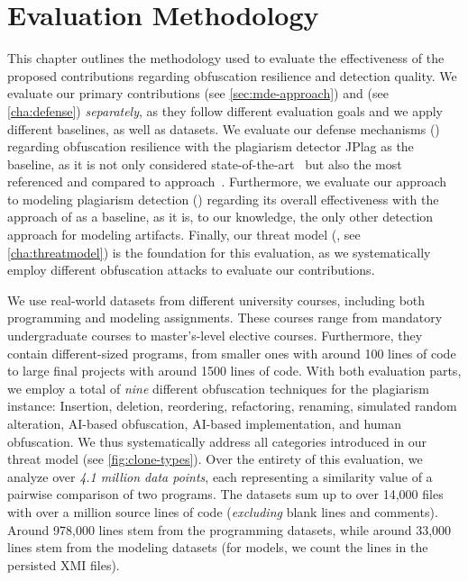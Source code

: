 \chapter{Evaluation Methodology}\label{cha:methodology}
This chapter outlines the methodology used to evaluate the effectiveness of the proposed contributions regarding obfuscation resilience and detection quality.
We evaluate our primary contributions  (see \autoref{sec:mde-approach}) and  (see \autoref{cha:defense}) \textit{separately}, as they follow different evaluation goals and we apply different baselines, as well as datasets.
%
We evaluate our defense mechanisms () regarding obfuscation resilience with the plagiarism detector JPlag as the baseline, as it is not only considered state-of-the-art~\cite{Aniceto2021} but also the most referenced and compared to approach~\cite{Novak2019}.
Furthermore, we evaluate our approach to modeling plagiarism detection () regarding its overall effectiveness with the approach of \citet{Martinez2020} as a baseline, as it is, to our knowledge, the only other detection approach for modeling artifacts.
Finally, our threat model (, see \autoref{cha:threatmodel}) is the foundation for this evaluation, as we systematically employ different obfuscation attacks to evaluate our contributions. 

We use real-world datasets from different university courses, including both programming and modeling assignments. These courses range from mandatory undergraduate courses to master's-level elective courses. Furthermore, they contain different-sized programs, from smaller ones with around 100 lines of code to large final projects with around 1500 lines of code.
With both evaluation parts, we employ a total of \textit{nine} different obfuscation techniques for the plagiarism instance:
Insertion, deletion, reordering, refactoring, renaming, simulated random alteration, AI-based obfuscation, AI-based implementation, and human obfuscation.
We thus systematically address all categories introduced in our threat model (see \autoref{fig:clone-types}).
%
Over the entirety of this evaluation, we analyze over \textit{4.1 million data points}, each representing a similarity value of a pairwise comparison of two programs. The datasets sum up to over 14,000 files with over a million source lines of code (\textit{excluding} blank lines and comments). Around 978,000 lines stem from the programming datasets, while around 33,000 lines stem from the modeling datasets (for models, we count the lines in the persisted \ac{XMI} files).

